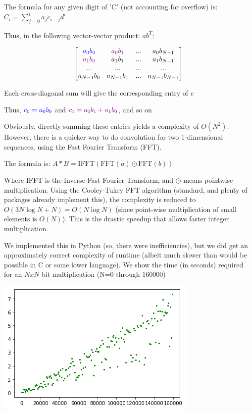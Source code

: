 \documentclass[a4paper,11pt]{article}
\theoremstyle{mytheor}
\begin{document}
The formula for any given digit of 'C' (not accounting for overflow) is: $C_i=\sum_{j=0}^{i} a_{j}c_{i-j}d^{i}$

Thus, in the following vector-vector product: $ab^T$:
\newcommand\GREEN{\color{violet}}
\newcommand\BLUE{\color{blue}}

$$ \begin{bmatrix}
\BLUE a_0 b_0 & \GREEN a_0 b_1 & ... & a_0 b_{N-1} \\
\GREEN a_1 b_0 & a_1 b_1 & ... & a_1 b_{N-1} \\
... & ... & ... & ... \\
a_{N-1} b_0 & a_{N-1} b_1 & ... & a_{N-1} b_{N-1} \\
\end{bmatrix} $$


Each cross-diagonal sum will give the corresponding entry of $c$

Thus, $\BLUE c_0 = a_0 b_0$ and $\GREEN c_1 = a_0 b_1 + a_1 b_0$, and so on

Obviously, directly summing these entries yields a complexity of $O(N^2)$. However, there is a quicker way to do convolution for two 1-dimensional sequences, using the Fast Fourier Transform (FFT).

The formula is: $A*B=\textrm{IFFT}(\textrm{FFT}(a) \odot \textrm{FFT}(b))$

Where IFFT is the Inverse Fast Fourier Transform, and $\odot$ means pointwise multiplication. Using the Cooley-Tukey FFT algorithm (standard, and plenty of packages already implement this), the complexity is reduced to $O(3N \log N + N) = O(N \log N)$ (since point-wise multiplication of small elements is $O(N)$). This is the drastic speedup that allows faster integer multiplication.

We implemented this in Python (so, there were inefficiencies), but we did get an approximately correct complexity of runtime (albeit much slower than would be possible in C or some lower language). We show the time (in seconds) required for an $NxN$ bit multiplication (N=0 through 160000)

\includegraphics{intMM_time}
\end{document}
